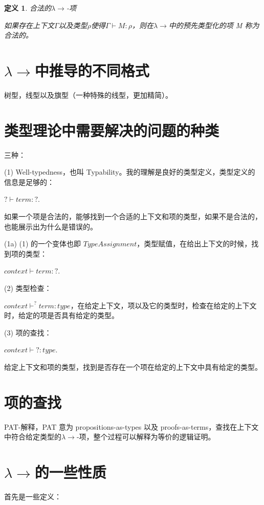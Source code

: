 \documentclass[UTF8]{article}
\newtheorem{thm}{定义}[section]
\begin{document}
		\begin{thm} 合法的$\lambda{\rightarrow}$-项
			
			如果存在上下文$\Gamma$以及类型$\rho$使得$\Gamma\vdash M:\rho$，则在$\lambda{\rightarrow}$中的预先类型化的项 M 称为合法的。
		\end{thm}
	
	\section{$\lambda{\rightarrow}$中推导的不同格式}
		树型，线型以及旗型（一种特殊的线型，更加精简）。
		
	\section{类型理论中需要解决的问题的种类}
		三种：
		
		(1) Well-typedness，也叫 Typability。我的理解是良好的类型定义，类型定义的信息是足够的：
		
		$?\vdash term : ?$.
		
		如果一个项是合法的，能够找到一个合适的上下文和项的类型，如果不是合法的，也能展示出为什么是错误的。
		
		(1a) (1) 的一个变体也即 $Type Assignment$，类型赋值，在给出上下文的时候，找到项的类型：
		
		$context \vdash term: ?$.
		
		(2) 类型检查：
		
		$context\vdash^? term:type$，在给定上下文，项以及它的类型时，检查在给定的上下文时，给定的项是否具有给定的类型。
		
		(3) 项的查找：
		
		$context\vdash ? : type$.
		
		给定上下文和项的类型，找到是否存在一个项在给定的上下文中具有给定的类型。

	\section{项的查找}
		PAT-解释，PAT 意为 propositions-as-types 以及 proofs-as-terms，查找在上下文中符合给定类型的$\lambda{\rightarrow}$-项，整个过程可以解释为等价的逻辑证明。
		
	\section{$\lambda{\rightarrow}$的一些性质}
		首先是一些定义：
		
\end{document}
